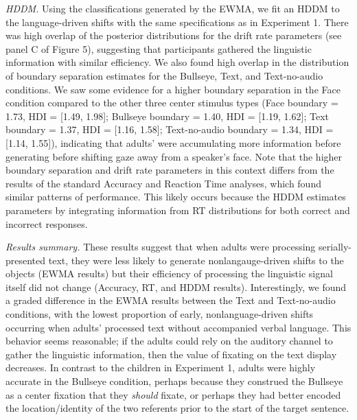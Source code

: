 \documentclass[english,floatsintext,man]{apa6}
\begin{document}
\emph{HDDM.} Using the classifications generated by the EWMA, we fit an
HDDM to the language-driven shifts with the same specifications as in
Experiment 1. There was high overlap of the posterior distributions for
the drift rate parameters (see panel C of Figure 5), suggesting that
participants gathered the linguistic information with similar
efficiency. We also found high overlap in the distribution of boundary
separation estimates for the Bullseye, Text, and Text-no-audio
conditions. We saw some evidence for a higher boundary separation in the
Face condition compared to the other three center stimulus types (Face
boundary = 1.73, HDI = {[}1.49, 1.98{]}; Bullseye boundary = 1.40, HDI =
{[}1.19, 1.62{]}; Text boundary = 1.37, HDI = {[}1.16, 1.58{]};
Text-no-audio boundary = 1.34, HDI = {[}1.14, 1.55{]}), indicating that
adults' were accumulating more information before generating before
shifting gaze away from a speaker's face. Note that the higher boundary
separation and drift rate parameters in this context differs from the
results of the standard Accuracy and Reaction Time analyses, which found
similar patterns of performance. This likely occurs because the HDDM
estimates parameters by integrating information from RT distributions
for both correct and incorrect responses.

\emph{Results summary.} These results suggest that when adults were
processing serially-presented text, they were less likely to generate
nonlangauge-driven shifts to the objects (EWMA results) but their
efficiency of processing the linguistic signal itself did not change
(Accuracy, RT, and HDDM results). Interestingly, we found a graded
difference in the EWMA results between the Text and Text-no-audio
conditions, with the lowest proportion of early, nonlanguage-driven
shifts occurring when adults' processed text without accompanied verbal
language. This behavior seems reasonable; if the adults could rely on
the auditory channel to gather the linguistic information, then the
value of fixating on the text display decreases. In contrast to the
children in Experiment 1, adults were highly accurate in the Bullseye
condition, perhaps because they construed the Bullseye as a center
fixation that they \emph{should} fixate, or perhaps they had better
encoded the location/identity of the two referents prior to the start of
the target sentence.
\end{document}
